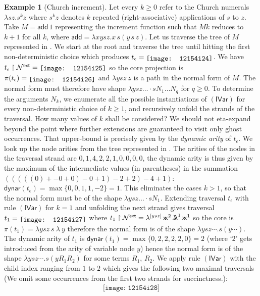 \documentclass[xchauthor,chkrefs,GCNS,amsmath,amsthm,rotating,leaveRGB]{tcsg}
\theoremstyle{plain}
\theoremstyle{definition}
\newtheorem{example}{Example}[section]
\newcommand{\Nodes}{\mathcal{N}}
\def\coresymbol{\pi}
\newcommand{\core}[1]{\coresymbol(#1)}
\newcommand{\ghostlmd}{{\lambda\mkern-7mu \lambda}}
\newcommand{\ghostvar}{\mathsf{x\mkern-5mu x}}
\newcommand{\ExternalNodes}{\Nodes^{\mathsf{ext}}}
\newcommand{\dynar}{\textsf{dynar}}
\begin{document}
\begin{example}[Church increment]\label{examp:churchincrement}
Let every $k\geq 0$ refer to the Church numerals $\lambda s z . s^{k} z$
where $s^{k} z$ denotes $k$ repeated (right-associative) applications of $s$
to $z$. Take $M = \mathsf{add}\, 1$ representing the increment function such
that $M k$ reduces to $k+1$ for all $k$, where $\mathsf{add} = \lambda x y s
z. x\, s (y\, s\, z)$. Let us traverse the tree of $M$ represented in
. We start at the root and traverse
the tree until hitting the first non-deterministic choice which produces
$t_\epsilon = \raisebox{-2pt}{\texttt{[image: 12154i24]}}$. We have $t_\epsilon
\upharpoonright  \ExternalNodes = \raisebox{-1pt}{\texttt{[image: 12154i25]}}$ so the core
projection is $\core{t_\epsilon } = \raisebox{-2pt}{\texttt{[image: 12154i26]}}$ and $\lambda
y s z ~ z$ is a path in the normal form of $M$. The normal form must
therefore have shape $\lambda y s z \ldots \cdot s N_{1} \ldots N_{q}$ for
$q\geq 0$. To determine the arguments $N_{k}$, we enumerate all the possible
instantiations of $\mathbf {(\mathsf{IVar})}$ for every non-deterministic
choice of $k\geq 1$, and recursively unfold the strands of the traversal. How
many values of $k$ shall be considered? We should not eta-expand beyond the
point where further extensions are guaranteed to visit only ghost
occurrences. That upper-bound is precisely given by the \emph{dynamic arity}
of $t_\epsilon $. We look up the node arities from the tree represented in
. The arities of the nodes in the
traversal strand are $0,1,4,2,2,1,0,0,0,0$, the dynamic arity is thus given
by the maximum of the intermediate values (in parentheses) in the summation
$(((((0) + -0+0) -0 +1) -2 + 2) -4 +1)$: $\dynar (t_\epsilon ) = \max \{
0,0,1,1,-2 \} = 1$. This eliminates the cases $k>1$, so that the normal form
must be of the shape $\lambda y s z \ldots \cdot s N_{1}$. Extending
traversal $t_\epsilon $ with rule $\mathbf {(\mathsf{IVar})}$ for $k=1$ and
unfolding the next strand gives traversal $t_{1} =
\raisebox{-2pt}{\texttt{[image: 12154i27]}}$ where $t_{1}\upharpoonright  \ExternalNodes =
\lambda ^{[y s z]} \, \ghostvar ^{2} \,{\ghostlmd ^{1}} \, \ghostvar ^{1}$ so
the core is $\core{t_{1}} =  \lambda y s z ~ s ~ \lambda ~ y $ therefore the
normal form is of the shape $\lambda y s z \cdots . s (y \cdots )$. The
dynamic arity of $t_{1}$ is $\dynar (t_{1}) = \max \{ 0, 2,2,2,2,0 \} = 2$
(where `$2$' gets introduced from the arity of variable node $y$) hence the
normal form is of the shape $\lambda y s z \cdots . s (y R_{1} R_{2})$ for
some terms $R_{1}$, $R_{2}$. We apply rule $\mathsf{(IVar)}$ with the child
index ranging from $1$ to $2$ which gives the following two maximal
traversals (We omit some occurrences from the first two strands for
succinctness.):
%
\begin{eqnarray*}
\texttt{[image: 12154i28]}
\end{eqnarray*}



\end{example}
\end{document}
